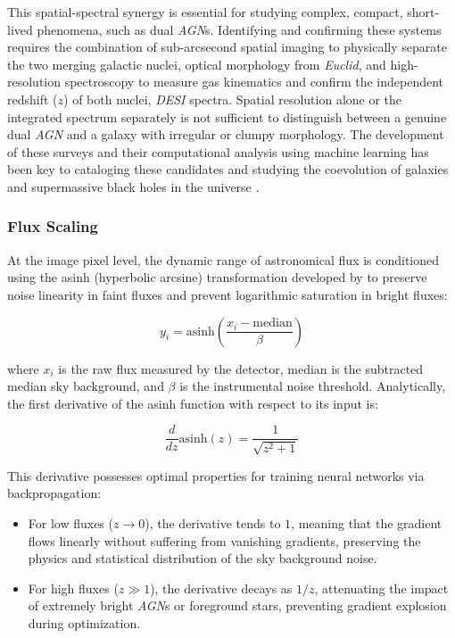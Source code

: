 This spatial-spectral synergy is essential for studying complex, compact, short-lived phenomena, such as dual \textit{\gls{AGN}}s. Identifying and confirming these systems requires the combination of sub-arcsecond spatial imaging to physically separate the two merging galactic nuclei, optical morphology from \textit{Euclid}, and high-resolution spectroscopy to measure gas kinematics and confirm the independent redshift ($z$) of both nuclei, \textit{\gls{DESI}} spectra. Spatial resolution alone or the integrated spectrum separately is not sufficient to distinguish between a genuine dual \textit{\gls{AGN}} and a galaxy with irregular or clumpy morphology. The development of these surveys and their computational analysis using machine learning has been key to cataloging these candidates and studying the coevolution of galaxies and supermassive black holes in the universe \autocites{ar:ulivi-2025}{ar:mezcua-2026}.

\subsubsection{Flux Scaling}

At the image pixel level, the dynamic range of astronomical flux is conditioned using the asinh (hyperbolic arcsine) transformation developed by \textcite{ar:lupton-1999} to preserve noise linearity in faint fluxes and prevent logarithmic saturation in bright fluxes:

\begin{equation}
y_i = \text{asinh}\left(\dfrac{x_i - \text{median}}{\beta}\right)
\label{eq:asinh_transformation}
\end{equation}

where $x_i$ is the raw flux measured by the detector, $\text{median}$ is the subtracted median sky background, and $\beta$ is the instrumental noise threshold. Analytically, the first derivative of the asinh function with respect to its input is:

\begin{equation}
\dfrac{d}{dz} \text{asinh}\left(z\right) = \dfrac{1}{\sqrt{z^2 + 1}}
\label{eq:asinh_derivative}
\end{equation}

This derivative possesses optimal properties for training neural networks via backpropagation:

\begin{itemize}
\item For low fluxes ($z \to 0$), the derivative tends to $1$, meaning that the gradient flows linearly without suffering from vanishing gradients, preserving the physics and statistical distribution of the sky background noise.
\item For high fluxes ($z \gg 1$), the derivative decays as $1/z$, attenuating the impact of extremely bright \textit{\gls{AGN}}s or foreground stars, preventing gradient explosion during optimization.
\end{itemize}

